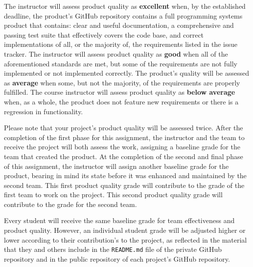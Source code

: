 \documentclass[11pt]{article}
\newcommand{\reflection}{\lstinline{README.md}}
\begin{document}
The instructor will assess product quality as {\bf excellent} when, by the established deadline, the product's GitHub
repository contains a full programming systems product that contains: clear and useful documentation, a comprehensive
and passing test suite that effectively covers the code base, and correct implementations of all, or the majority of,
the requirements listed in the issue tracker. The instructor will assess product quality as {\bf good} when all of the
aforementioned standards are met, but some of the requirements are not fully implemented or not implemented correctly.
The product's quality will be assessed as {\bf average} when some, but not the majority, of the requirements are
properly fulfilled. The course instructor will assess product quality as {\bf below average} when, as a whole, the
product does not feature new requirements or there is a regression in functionality.

Please note that your project's product quality will be assessed twice. After the completion of the first phase for this
assignment, the instructor and the team to receive the project will both assess the work, assigning a baseline grade for
the team that created the product. At the completion of the second and final phase of this assignment, the instructor
will assign another baseline grade for the product, bearing in mind its state before it was enhanced and maintained by
the second team. This first product quality grade will contribute to the grade of the first team to work on the project.
This second product quality grade will contribute to the grade for the second team.

Every student will receive the same baseline grade for team effectiveness and product quality. However, an individual
student grade will be adjusted higher or lower according to their contribution's to the project, as reflected in the
material that they and others include in the \reflection{} file of the private GitHub repository and in the public
repository of each project's GitHub repository.





\end{document}
